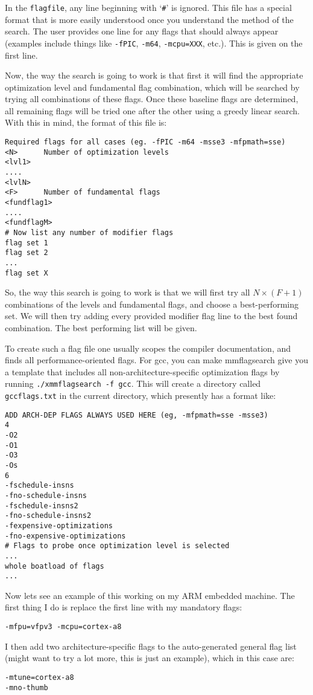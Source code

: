 \documentclass[11pt]{article}
\begin{document}
In the {\tt flagfile}, any line beginning with `\verb+#+' is ignored.
This file has a special format that is more easily understood once 
you understand the method of the search.  The user provides one line
for any flags that should always appear (examples include things like
{\tt -fPIC}, {\tt -m64}, {\tt -mcpu=XXX}, etc.).  This is given on the
first line.

Now, the way the search is going to work is that first it will find
the appropriate optimization level and fundamental flag combination,
which will be searched by trying all combinations of these flags.
Once these baseline flags are determined, all remaining flags will
be tried one after the other using a greedy linear search.
With this in mind, the format of this file is:
\begin{verbatim}
Required flags for all cases (eg. -fPIC -m64 -msse3 -mfpmath=sse)
<N>      Number of optimization levels
<lvl1>
....
<lvlN>
<F>      Number of fundamental flags
<fundflag1>
....
<fundflagM>
# Now list any number of modifier flags
flag set 1
flag set 2
...
flag set X
\end{verbatim}

So, the way this search is going to work is that we will first try all
$N \times (F+1)$ combinations of the levels and fundamental flags, and
choose a best-performing set.  We will then try adding every provided modifier
flag line to the best found combination.  The best performing list will be 
given.  

To create such a flag file one usually scopes the compiler documentation, 
and finds all performance-oriented flags.  For gcc, you can make mmflagsearch
give you a template that includes all non-architecture-specific optimization
flags by running {\tt ./xmmflagsearch -f gcc}.  This will create a directory
called {\tt gccflags.txt} in the current directory, which presently has
a format like:
\begin{verbatim}
ADD ARCH-DEP FLAGS ALWAYS USED HERE (eg, -mfpmath=sse -msse3)
4
-O2
-O1
-O3
-Os
6
-fschedule-insns 
-fno-schedule-insns 
-fschedule-insns2
-fno-schedule-insns2
-fexpensive-optimizations
-fno-expensive-optimizations
# Flags to probe once optimization level is selected
...
whole boatload of flags
...
\end{verbatim}

Now lets see an example of this working on my ARM embedded machine.  The first
thing I do is replace the first line with my mandatory flags:
\begin{verbatim}
-mfpu=vfpv3 -mcpu=cortex-a8
\end{verbatim}
I then add two architecture-specific flags to the auto-generated general
flag list (might want to try a lot more, this is just an example), 
which in this case are:
\begin{verbatim}
-mtune=cortex-a8
-mno-thumb
\end{verbatim}
\end{document}
